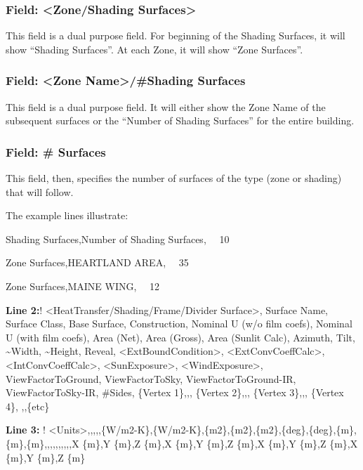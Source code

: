 \subsubsection{Field: \textless{}Zone/Shading Surfaces\textgreater{}}\label{field-zoneshading-surfaces}

This field is a dual purpose field. For beginning of the Shading Surfaces, it will show ``Shading Surfaces''. At each Zone, it will show ``Zone Surfaces''.

\subsubsection{Field: \textless{}Zone Name\textgreater{}/\#Shading Surfaces}\label{field-zone-nameshading-surfaces}

This field is a dual purpose field. It will either show the Zone Name of the subsequent surfaces or the ``Number of Shading Surfaces'' for the entire building.

\subsubsection{Field: \# Surfaces}\label{field-surfaces}

This field, then, specifies the number of surfaces of the type (zone or shading) that will follow.

The example lines illustrate:

Shading Surfaces,Number of Shading Surfaces,~~ 10

Zone Surfaces,HEARTLAND AREA,~~ 35

Zone Surfaces,MAINE WING,~~ 12

\textbf{Line 2:}! \textless{}HeatTransfer/Shading/Frame/Divider Surface\textgreater{}, Surface Name, Surface Class, Base Surface, Construction, Nominal U (w/o film coefs), Nominal U (with film coefs), Area (Net), Area (Gross), Area (Sunlit Calc), Azimuth, Tilt, \textasciitilde{}Width, \textasciitilde{}Height, Reveal, \textless{}ExtBoundCondition\textgreater{}, \textless{}ExtConvCoeffCalc\textgreater{}, \textless{}IntConvCoeffCalc\textgreater{}, \textless{}SunExposure\textgreater{}, \textless{}WindExposure\textgreater{}, ViewFactorToGround, ViewFactorToSky, ViewFactorToGround-IR, ViewFactorToSky-IR, \#Sides, \{Vertex 1\},,, \{Vertex 2\},,, \{Vertex 3\},,, \{Vertex 4\}, ,,\{etc\}

\textbf{Line 3:} ! \textless{}Units\textgreater{},,,,,\{W/m2-K\},\{W/m2-K\},\{m2\},\{m2\},\{m2\},\{deg\},\{deg\},\{m\},\{m\},\{m\},,,,,,,,,,X \{m\},Y \{m\},Z \{m\},X \{m\},Y \{m\},Z \{m\},X \{m\},Y \{m\},Z \{m\},X \{m\},Y \{m\},Z \{m\}

